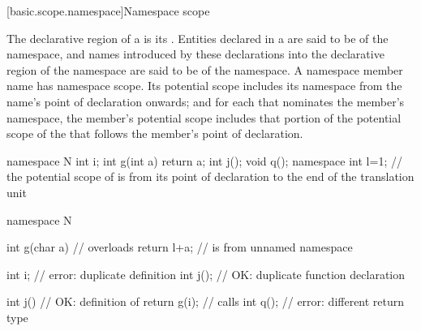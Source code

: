 [basic.scope.namespace]{Namespace scope}

\pnum
{}%
The declarative region of a  is its
.  Entities declared in a
 are said to be  of the
namespace, and names introduced by these declarations into the
declarative region of the namespace are said to be  of the namespace. A namespace member name has namespace scope.
Its potential scope includes its namespace from the name's point of
declaration onwards; and for each
 that nominates the
member's namespace, the member's potential scope includes that portion
of the potential scope of the  that follows
the member's point of declaration.
\begin{example}

\begin{codeblock}
namespace N {
  int i;
  int g(int a) { return a; }
  int j();
  void q();
}
namespace { int l=1; }
// the potential scope of  is from its point of declaration to the end of the translation unit

namespace N {
  int g(char a) {   // overloads 
    return l+a;     //  is from unnamed namespace
  }

  int i;            // error: duplicate definition
  int j();          // OK: duplicate function declaration

  int j() {         // OK: definition of 
    return g(i);    // calls 
  }
  int q();          // error: different return type
}
\end{codeblock}
\end{example}

